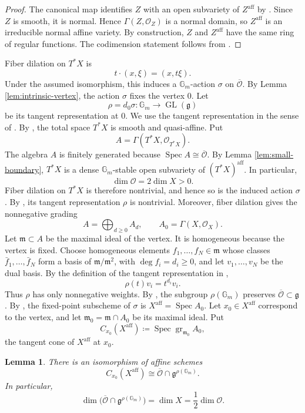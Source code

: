 \documentclass[12pt]{article}
\newtheorem{lemma}[theorem]{Lemma}
\theoremstyle{remark}
\theoremstyle{plain}
\DeclareMathOperator{\Spec}{Spec}
\newcommand{\Gm}{\mathbb G_m}
\newcommand{\aff}{\mathrm{aff}}
\begin{document}
\begin{proof}
The canonical map identifies $Z$ with an open subvariety of
$Z^{\aff}$ by \cite[Lemma 28.19.4]{Stacks}.
Since $Z$ is smooth, it is normal. Hence
$\Gamma(Z,\mathcal O_Z)$ is a normal domain, so $Z^{\aff}$ is an
irreducible normal affine variety.
By construction, $Z$ and $Z^{\aff}$ have the same ring of regular
functions. The codimension statement follows from
\cite[Theorem 4.2]{Grosshans}.
\end{proof}
Fiber dilation on $T^*X$ is
\[
t\cdot(x,\xi)=(x,t\xi).
\]
Under the assumed isomorphism, this induces a $\Gm$-action $\sigma$ on
$\overline{\mathcal O}$. By Lemma \ref{lem:intrinsic-vertex}, the
action $\sigma$ fixes the vertex $0$. Let
\[
\rho=d_0\sigma:\Gm\longrightarrow\operatorname{GL}(\mathfrak g)
\]
be its tangent representation at $0$. We use the tangent representation
in the sense of \cite[Section 5]{Jia}. By \cite[Lemma 4.5]{Jia}, the
total space $T^*X$ is smooth and quasi-affine. Put
\[
A=\Gamma(T^*X,\mathcal O_{T^*X}).
\]
The algebra $A$ is finitely generated because
$\Spec A\cong\overline{\mathcal O}$. By Lemma
\ref{lem:small-boundary}, $T^*X$ is a dense $\Gm$-stable open
subvariety of $(T^*X)^{\aff}$. In particular,
\[
\dim\mathcal O=2\dim X>0.
\]
Fiber dilation on $T^*X$ is therefore nontrivial, and hence so is the
induced action $\sigma$.
By \cite[Lemma 5.1]{Jia}, its tangent representation $\rho$ is
nontrivial.
Moreover, fiber dilation gives the nonnegative grading
\[
A=\bigoplus_{d\geq0}A_d,
\qquad
A_0=\Gamma(X,\mathcal O_X).
\]
Let $\mathfrak m\subset A$ be the maximal ideal of the vertex.
It is homogeneous because the vertex is fixed.
Choose homogeneous elements $f_1,\ldots,f_N\in\mathfrak m$ whose
classes $\bar f_1,\ldots,\bar f_N$ form a basis of
$\mathfrak m/\mathfrak m^2$, with $\deg f_i=d_i\geq0$, and let
$v_1,\ldots,v_N$ be the dual basis.
By the definition of the tangent representation in \cite[Section 5]{Jia},
\[
\rho(t)v_i=t^{d_i}v_i.
\]
Thus $\rho$ has only nonnegative weights.
By \cite[Lemma 5.2]{Jia}, the subgroup $\rho(\Gm)$ preserves
$\overline{\mathcal O}\subset\mathfrak g$.
By \cite[Lemma 5.4]{Jia}, the fixed-point subscheme of $\sigma$ is
$X^{\aff}=\Spec A_0$.
Let $x_0\in X^{\aff}$ correspond to the vertex, and let
$\mathfrak m_0=\mathfrak m\cap A_0$ be its maximal ideal. Put
\[
C_{x_0}(X^{\aff})
\coloneqq
\Spec\operatorname{gr}_{\mathfrak m_0}A_0,
\]
the tangent cone of $X^{\aff}$ at $x_0$.

\begin{lemma}\label{lem:fixed-tangent-cone}
There is an isomorphism of affine schemes
\[
C_{x_0}(X^{\aff})
\cong
\overline{\mathcal O}\cap
\mathfrak g^{\rho(\Gm)}.
\]
In particular,
\[
\dim\bigl(\overline{\mathcal O}\cap\mathfrak g^{\rho(\Gm)}\bigr)
=\dim X=\frac12\dim\mathcal O.
\]
\end{lemma}
\end{document}
